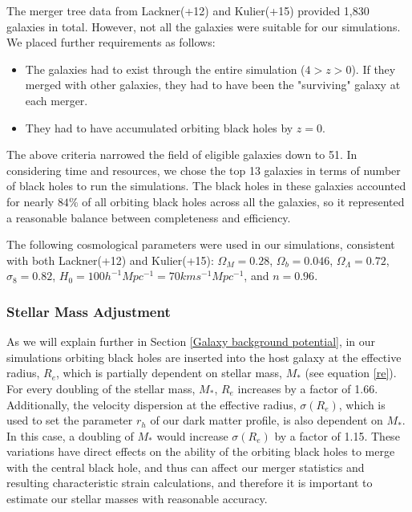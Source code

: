 \documentclass[english, apj]{emulateapj}
\begin{document}
The merger tree data from Lackner(+12) and Kulier\-(+15) provided 1,830 galaxies in total.  However, not all the galaxies were suitable for our simulations.  We placed further requirements as follows:
\begin{itemize}
\item The galaxies had to exist through the entire simulation ($4 > z > 0$).  If they merged with other galaxies, they had to have been the "surviving" galaxy at each merger.
\item They had to have accumulated orbiting black holes by $z = 0$.
\end{itemize}

The above criteria narrowed the field of eligible galaxies down to 51.  In considering time and resources, we chose the top 13 galaxies in terms of number of black holes to run the simulations.  The black holes in these galaxies accounted for nearly $84{\%}$ of all orbiting black holes across all the galaxies, so it represented a reasonable balance between completeness and efficiency.

The following cosmological parameters were used in our simulations, consistent with both Lackner(+12) and Kulier(+15):   $\Omega_M = 0.28$, $\Omega_b = 0.046$, $\Omega_\Lambda = 0.72$, $\sigma_8 = 0.82$, $H_0 = 100h^{-1}Mpc^{-1} = 70 km s^{-1} Mpc^{-1}$, and $n = 0.96$.

\subsubsection{Stellar Mass Adjustment}
As we will explain further in Section \ref{Galaxy background potential}, in our simulations orbiting black holes are inserted into the host galaxy at the effective radius, $R_e$, which is partially dependent on stellar mass, $M_*$ (see equation \ref{re}).  For every doubling of the stellar mass, $M_*$, $R_e$ increases by a factor of 1.66.  Additionally, the velocity dispersion at the effective radius, $\sigma(R_e)$, which is used to set the parameter $r_h$ of our dark matter profile, is also dependent on $M_*$.  In this case, a doubling of $M_*$ would increase $\sigma(R_e)$ by a factor of 1.15.  These variations have direct effects on the ability of the orbiting black holes to merge with the central black hole, and thus can affect our merger statistics and resulting characteristic strain calculations, and therefore it is important to estimate our stellar masses with reasonable accuracy.
\end{document}
